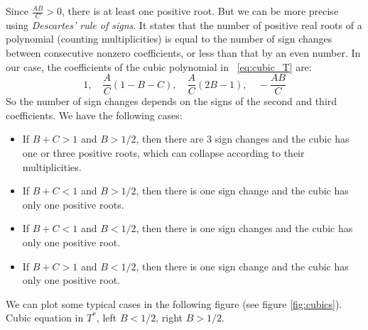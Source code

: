 \documentclass[a4paper, 12pt]{article}
\providecommand{\DIFaddtex}[1]{{\protect\color{blue} \sf #1}} %
\providecommand{\DIFdeltex}[1]{{\protect\color{red} \scriptsize #1}} %
\providecommand{\DIFaddbegin}{} %
\providecommand{\DIFaddend}{} %
\providecommand{\DIFdelbegin}{} %
\providecommand{\DIFdelend}{} %
\providecommand{\DIFdelFL}[1]{\DIFdel{#1}} %
\providecommand{\DIFadd}[1]{\texorpdfstring{\DIFaddtex{#1}}{#1}} %
\providecommand{\DIFdel}[1]{\texorpdfstring{\DIFdeltex{#1}}{}} %
\begin{document}
Since $\frac{AB}{C} > 0$,  there is at least one positive root. 
But we can be more precise using 
\emph{Descartes' rule of signs}. It states that the number of positive real roots of a polynomial (counting multiplicities) is equal to the number of sign changes between consecutive nonzero coefficients, or less than that by an even number. 
In our case, the coefficients of the cubic polynomial in\DIFaddbegin \DIFadd{~}\DIFaddend \eqref{eq:cubic_T} are:
\[1, \quad \frac{A}{C} \left(1- B- C \right), \quad \frac{A}{C} \left(2 B -1 \right), \quad - \frac{A B}{C}   \]  
So the number of sign changes depends on the signs of the second and third coefficients.
We have the following cases:
\begin{itemize}
\item If $ B +C > 1$ and $B > 1/2$, then there are 3 sign changes and the cubic has one or three positive roots, which can collapse according to their multiplicities.
\item If $B +C  < 1$ and $B > 1/2 $, then there is one sign change and the cubic has only one positive roots.
\item If $B +C  < 1$ and $B < 1/2$, then there is one sign changes and the cubic has only one positive root.
\item If $B +C  > 1$ and $B < 1/2$, then there is one sign change and the cubic has only one positive root.
\end{itemize}
\DIFdelbegin %
\DIFdel{We can plot some typical cases in the following figure (see figure \ref{fig:cubics}).
}%
{%
\DIFdelFL{Cubic equation in $T^*$, left $B<1/2$, right $B>1/2$.}}
\DIFdelend %
\end{document}
